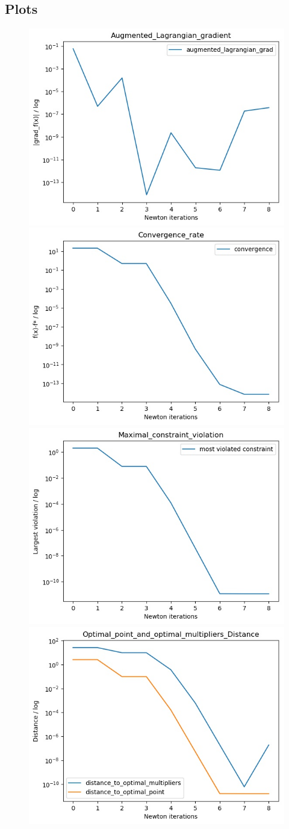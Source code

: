 \documentclass[12pt]{article}
\begin{document}
\newpage
\subsection{Plots}

\begin{figure}[h!]
\centering
\includegraphics[width=.4\textwidth]{pics/Augmented_Lagrangian_gradient_fig}
\includegraphics[width=.4\textwidth]{pics/Convergence_rate_fig}
\includegraphics[width=.4\textwidth]{pics/Maximal_constraint_violation_fig}
\includegraphics[width=.4\textwidth]{pics/Optimal_point_and_optimal_multipliers_Distance_fig}
\end{figure}
\end{document}
